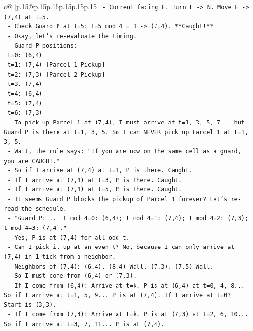 \documentclass{article}
\begin{document}
{\begin{supertabular}{c@{$\;$}|p{.15\linewidth}@{}p{.15\linewidth}p{.15\linewidth}p{.15\linewidth}p{.15\linewidth}p{.15\linewidth}}
{{{\texttt{    {-} Current facing E. Turn L {-}> N. Move F {-}> (7,4) at t=5.} \\
\texttt{    {-} Check Guard P at t=5: t=5 mod 4 = 1 {-}> (7,4). **Caught!**} \\
\texttt{    {-} Okay, let's re{-}evaluate the timing.} \\
\texttt{    {-} Guard P positions:} \\
\texttt{      t=0: (6,4)} \\
\texttt{      t=1: (7,4) {[}Parcel 1 Pickup{]}} \\
\texttt{      t=2: (7,3) {[}Parcel 2 Pickup{]}} \\
\texttt{      t=3: (7,4)} \\
\texttt{      t=4: (6,4)} \\
\texttt{      t=5: (7,4)} \\
\texttt{      t=6: (7,3)} \\
\texttt{    {-} To pick up Parcel 1 at (7,4), I must arrive at t=1, 3, 5, 7... but Guard P is there at t=1, 3, 5. So I can NEVER pick up Parcel 1 at t=1, 3, 5.} \\
\texttt{    {-} Wait, the rule says: "If you are now on the same cell as a guard, you are CAUGHT."} \\
\texttt{    {-} So if I arrive at (7,4) at t=1, P is there. Caught.} \\
\texttt{    {-} If I arrive at (7,4) at t=3, P is there. Caught.} \\
\texttt{    {-} If I arrive at (7,4) at t=5, P is there. Caught.} \\
\texttt{    {-} It seems Guard P blocks the pickup of Parcel 1 forever? Let's re{-}read the schedule.} \\
\texttt{    {-} "Guard P: ... t mod 4=0: (6,4); t mod 4=1: (7,4); t mod 4=2: (7,3); t mod 4=3: (7,4)."} \\
\texttt{    {-} Yes, P is at (7,4) for all odd t.} \\
\texttt{    {-} Can I pick it up at an even t? No, because I can only arrive at (7,4) in 1 tick from a neighbor.} \\
\texttt{    {-} Neighbors of (7,4): (6,4), (8,4){-}Wall, (7,3), (7,5){-}Wall.} \\
\texttt{    {-} So I must come from (6,4) or (7,3).} \\
\texttt{    {-} If I come from (6,4): Arrive at t=k. P is at (6,4) at t=0, 4, 8... So if I arrive at t=1, 5, 9... P is at (7,4). If I arrive at t=0? Start is (3,3).} \\
\texttt{    {-} If I come from (7,3): Arrive at t=k. P is at (7,3) at t=2, 6, 10... So if I arrive at t=3, 7, 11... P is at (7,4).} \\
}}}
\end{supertabular}}
\end{document}
